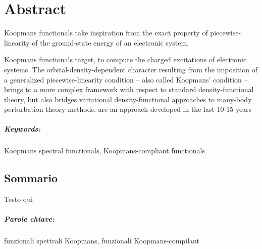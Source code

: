 \begingroup
\let\cleardoublepage\clearpage

\cleardoublepage
\chapter*{Abstract}
\vspace{2cm}
%
Koopmans functionals take inspiration from the exact property of piecewise-linearity of the ground-state energy of an electronic system,


Koopmans functionals target, to compute the charged excitations of electronic systems. The orbital-density-dependent character resulting from the imposition of a generalized piecewise-linearity condition -- also called Koopmans' condition -- brings to a more complex framework with respect to standard density-functional theory, but also bridges variational density-functional approaches to many-body perturbation theory methods.
are an approach developed in the last 10-15 years
%
\paragraph{Keywords:}
Koopmans spectral functionals,
Koopmans-compliant functionals
%

\begin{otherlanguage}{italian}
\cleardoublepage
\chapter*{Sommario}
\vspace{2cm}
%
Testo qui
%
\paragraph{Parole chiave:}
funzionali spettrali Koopmans,
funzionali Koopmans-compilant
%
\end{otherlanguage}

\endgroup			
\vfill
